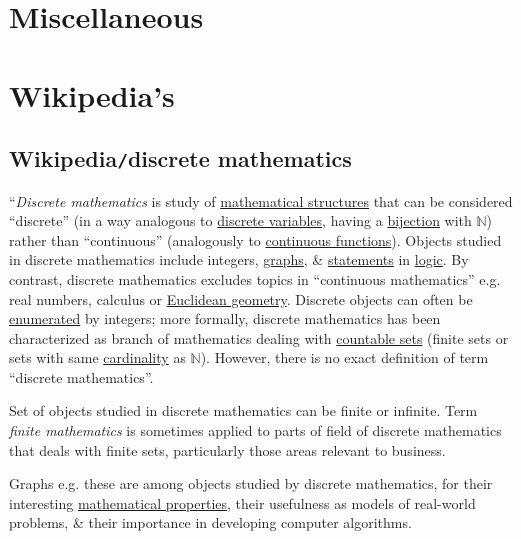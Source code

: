 \documentclass{article}
\begin{document}
\section{Miscellaneous}


\section{Wikipedia's}

\subsection{Wikipedia{\tt/}discrete mathematics}
``{\it Discrete mathematics} is study of \href{https://en.wikipedia.org/wiki/Mathematical_structures}{mathematical structures} that can be considered ``discrete'' (in a way analogous to \href{https://en.wikipedia.org/wiki/Discrete_variable}{discrete variables}, having a \href{https://en.wikipedia.org/wiki/Bijection}{bijection} with $\mathbb{N}$) rather than ``continuous'' (analogously to \href{https://en.wikipedia.org/wiki/Continuous_function}{continuous functions}). Objects studied in discrete mathematics include integers, \href{https://en.wikipedia.org/wiki/Graph_(discrete_mathematics)}{graphs}, \& \href{https://en.wikipedia.org/wiki/Statement_(logic)}{statements} in \href{https://en.wikipedia.org/wiki/Mathematical_logic}{logic}. By contrast, discrete mathematics excludes topics in ``continuous mathematics'' e.g. real numbers, calculus or \href{https://en.wikipedia.org/wiki/Euclidean_geometry}{Euclidean geometry}. Discrete objects can often be \href{https://en.wikipedia.org/wiki/Enumeration}{enumerated} by integers; more formally, discrete mathematics has been characterized as branch of mathematics dealing with \href{https://en.wikipedia.org/wiki/Countable_set}{countable sets} (finite sets or sets with same \href{https://en.wikipedia.org/wiki/Cardinality}{cardinality} as $\mathbb{N}$). However, there is no exact definition of term ``discrete mathematics''.

Set of objects studied in discrete mathematics can be finite or infinite. Term {\it finite mathematics} is sometimes applied to parts of field of discrete mathematics that deals with finite sets, particularly those areas relevant to business.

{\sf Graphs e.g. these are among objects studied by discrete mathematics, for their interesting \href{https://en.wikipedia.org/wiki/Graph_property}{mathematical properties}, their usefulness as models of real-world problems, \& their importance in developing computer algorithms.}
\end{document}
